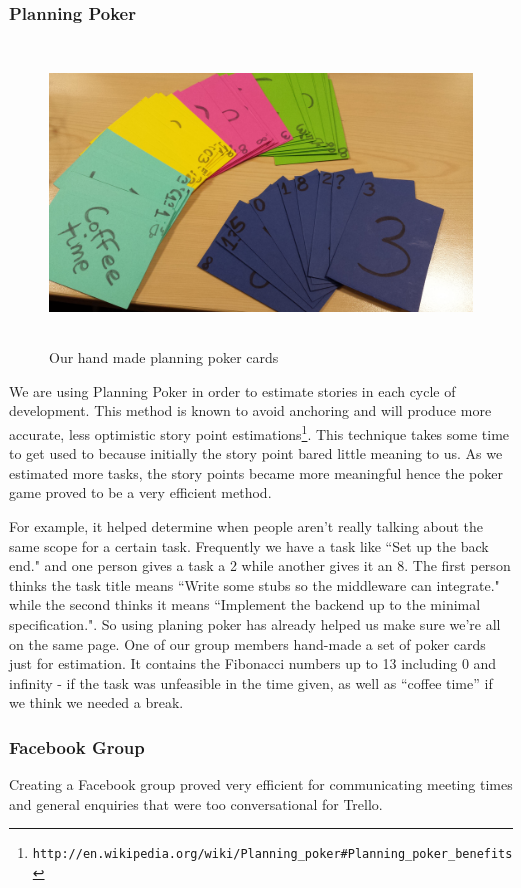 \documentclass[11pt, a4paper]{article}
\begin{document}
\subsubsection{Planning Poker}
\begin{figure}[h!]
\centering
\includegraphics[height=80mm,width=130mm]{planningPokers.jpg}
\caption{Our hand made planning poker cards}
\end{figure}

We are using Planning Poker in order to estimate stories in each cycle of development. 
This method is known to avoid anchoring and will produce more accurate, less optimistic story point estimations\footnote{\tt{http://en.wikipedia.org/wiki/Planning\_poker\#Planning\_poker\_benefits}}. This technique takes some time to get used to because initially the story point bared little meaning to us.
As we estimated more tasks, the story points became more meaningful hence the poker game proved to be a very efficient method.

For example, it helped determine when people aren't really talking about the same scope for a certain task.
Frequently we have a task like ``Set up the back end." and one person gives a task a 2 while another gives it an 8.
The first person thinks the task title means ``Write some stubs so the middleware can integrate." while the second thinks it means ``Implement the backend up to the minimal specification.". 
So using planing poker has already helped us make sure we're all on the same page.
One of our group members hand-made a set of poker cards just for estimation.
It contains the Fibonacci numbers up to 13 including 0 and infinity - if the task was unfeasible in the time given, as well as ``coffee time'' if we think we needed a break. 

\subsubsection{Facebook Group}
Creating a Facebook group proved very efficient for communicating meeting times and general enquiries that were too conversational for Trello.
\end{document}
